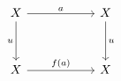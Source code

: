 \[
\begin{tikzcd}[column sep=5.5em, row sep=3.2em]
 X \arrow[r,"a"] \arrow[d,"u"'] & X \arrow[d,"u"] \\
 X \arrow[r,"f(a)"]             & X
\end{tikzcd}
\]

